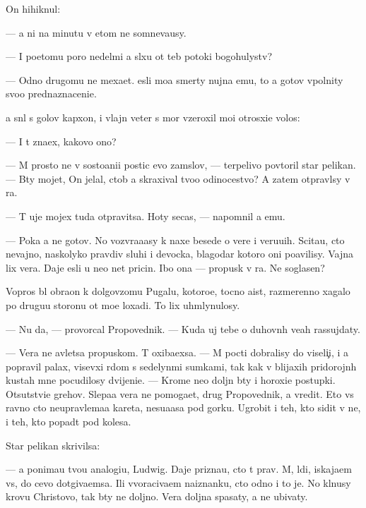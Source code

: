 \documentclass[10pt]{book}
\begin{document}
On hihiknul:

— {\Y}a ni na minutu v etom ne somneva{\y}usy.

— I poetomu poro{\y} nedel{\ia}mi {\y}a sl{\yi}xu ot teb{\ia} potoki bogohulystv?

— Odno drugomu ne mexa{\y}et. {\Y}esli mo{\y}a smerty nujna {\Y}emu, to {\y}a gotov v{\yi}\-pol\-nity svo{\y}o prednaznaceni{\y}e.

{\Y}a sn{\ia}l s golov{\yi} kap{\io}xon, i vlajn{\yi}{\y} veter s mor{\ia} vz{\y}eroxil mo{\y}i otrosxi{\y}e volos{\yi}:

— I t{\yi} zna\-{\y}ex, kakovo ono?

— M{\yi} prosto ne v sosto{\y}ani{\y}i postic {\Y}evo zam{\yi}slov, — terpelivo povtoril star{\yi}{\y} pelikan. — B{\yi}ty mojet, On jelal, ctob{\yi} {\y}a skraxival tvo{\y}o odinocestvo? A zatem otpravl{\io}sy v ra{\y}.

— T{\yi} uje mojex tuda otpravitsa. Hoty se{\y}cas, — napomnil {\y}a {\y}emu.

— Poka {\y}a ne gotov. No vozvra{\x}a{\y}asy k naxe{\y} besede o vere i veru{\y}u{\x}ih. Scita{\y}u, cto ne\-vaj\-no, naskolyko pravdiv{\yi} sluhi i devocka, blagodar{\ia} kotoro{\y} oni po{\y}avilisy. Vajna lix vera. Daje {\y}esli u ne{\y}o net pricin{\yi}. Ibo ona — propusk v ra{\y}. Ne soglasen?

Vopros b{\yi}l obra{\x}on k dolgov{\ia}zomu Pugalu, kotoro{\y}e, tocno aist, razmerenno xagalo po drugu{\y}u storonu ot mo{\y}e{\y} loxadi. To lix uhm{\yi}lynulosy.

— Nu da, — provorcal Pro\-po\-ved\-nik. — Kuda uj tebe o duhovn{\yi}h ve{\x}ah rassujdaty.

— Vera ne {\y}avl{\ia}{\y}etsa propuskom. T{\yi} oxiba{\y}exsa. — M{\yi} pocti dobralisy do viseli{\c}i, i {\y}a popravil palax, visevxi{\y} r{\ia}dom s sedelyn{\yi}mi sumkami, tak kak v blija{\y}xih pridorojn{\yi}h kustah mne pocudilosy dvijeni{\y}e. — Krome ne{\y}o doljn{\yi} b{\yi}ty i horoxi{\y}e postupki. Otsutstvi{\y}e grehov. Slepa{\y}a vera ne pomoga{\y}et, drug Pro\-po\-ved\-nik, a vredit. Eto vs{\e} ravno cto neupravl{\ia}{\y}ema{\y}a kareta, nesu{\x}a{\y}asa pod gorku. Ugrobit i teh, kto sidit v ne{\y}, i teh, kto popad{\e}t pod kolesa.

Star{\yi}{\y} pelikan skrivilsa:

— {\Y}a ponima{\y}u tvo{\y}u analogi{\y}u, Ludwig. Daje prizna{\y}u, cto t{\yi} prav. M{\yi}, l{\io}di, iskaja{\y}em vs{\e}, do cevo dot{\ia}giva{\y}emsa. Ili v{\yi}voraciva{\y}em naiznanku, cto odno i to je. No kl{\ia}nusy krov{\y}u Christovo{\y}, tak b{\yi}ty ne doljno. Vera doljna spasaty, a ne ubivaty.
\end{document}

